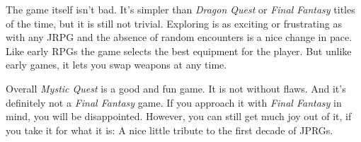 The game itself isn’t bad. It’s simpler than \textit{Dragon Quest} or \textit{Final Fantasy} titles of the time, but it is still not trivial. Exploring is as exciting or frustrating as with any JRPG and the absence of random encounters is a nice change in pace. Like early RPGs the game selects the best equipment for the player. But unlike early games, it lets you swap weapons at any time.

Overall \textit{Mystic Quest} is a good and fun game. It is not without flaws. And it's definitely not a \textit{Final Fantasy} game. If you approach it with \textit{Final Fantasy} in mind, you will be disappointed. However, you can still get much joy out of it, if you take it for what it is: A nice little tribute to the first decade of JPRGs.

